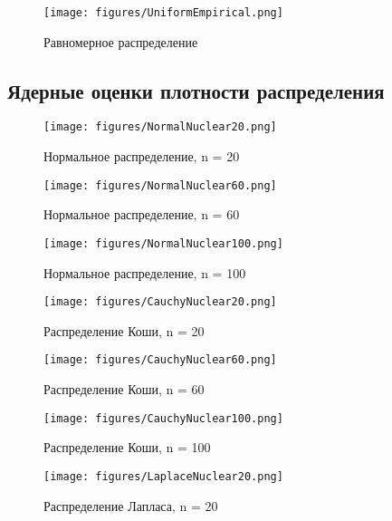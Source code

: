 \documentclass[../main.tex]{subfiles}
\begin{document}
    \begin{figure}[H]
        \centering
        \texttt{[image: figures/UniformEmpirical.png]}
        \caption{Равномерное распределение}
        \label{fig:normal}
    \end{figure}
    
    \subsection{Ядерные оценки плотности распределения}
    
    \begin{figure}[H]
        \centering
        \texttt{[image: figures/NormalNuclear20.png]}
        \caption{Нормальное распределение, n = 20}
        \label{fig:normal}
    \end{figure}
    
    \begin{figure}[H]
        \centering
        \texttt{[image: figures/NormalNuclear60.png]}
        \caption{Нормальное распределение, n = 60}
        \label{fig:normal}
    \end{figure}
    
    \begin{figure}[H]
        \centering
        \texttt{[image: figures/NormalNuclear100.png]}
        \caption{Нормальное распределение, n = 100}
        \label{fig:normal}
    \end{figure}
    
    \begin{figure}[H]
        \centering
        \texttt{[image: figures/CauchyNuclear20.png]}
        \caption{Распределение Коши, n = 20}
        \label{fig:normal}
    \end{figure}
    
    \begin{figure}[H]
        \centering
        \texttt{[image: figures/CauchyNuclear60.png]}
        \caption{Распределение Коши, n = 60}
        \label{fig:normal}
    \end{figure}
    
    \begin{figure}[H]
        \centering
        \texttt{[image: figures/CauchyNuclear100.png]}
        \caption{Распределение Коши, n = 100}
        \label{fig:normal}
    \end{figure}
    
    \begin{figure}[H]
        \centering
        \texttt{[image: figures/LaplaceNuclear20.png]}
        \caption{Распределение Лапласа, n = 20}
        \label{fig:normal}
    \end{figure}
    
\end{document}
